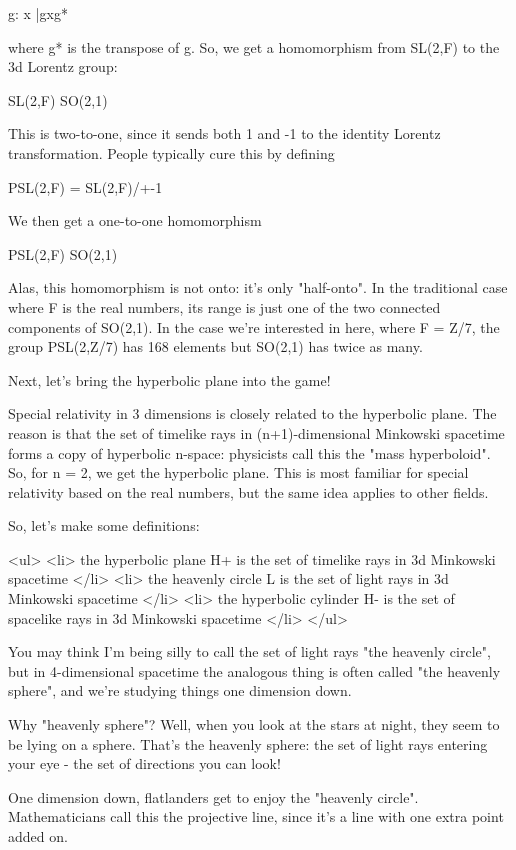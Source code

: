 g: x |\to  gxg*

where g* is the transpose of g.   So, we get a homomorphism from SL(2,F)
to the 3d Lorentz group:

SL(2,F) \to  SO(2,1)

This is two-to-one, since it sends both 1 and -1 to the identity Lorentz 
transformation.   People typically cure this by defining

PSL(2,F) = SL(2,F)/{+-1}

We then get a one-to-one homomorphism

PSL(2,F) \to  SO(2,1)

Alas, this homomorphism is not onto: it's only "half-onto".  
In the traditional
case where F is the real numbers, its range is just one of the two connected 
components of SO(2,1).  In the case we're interested in here, where F = Z/7, 
the group PSL(2,Z/7) has 168 elements but SO(2,1) has twice as many. 

Next, let's bring the hyperbolic plane into the game!

Special relativity in 3 dimensions is closely related to the hyperbolic
plane.  The reason is that the set of timelike rays in (n+1)-dimensional Minkowski
spacetime forms a copy of hyperbolic n-space: physicists call this the
"mass hyperboloid".   
So, for n = 2, we get the hyperbolic plane.  This is 
most familiar for special relativity based on the real numbers, but the same 
idea applies to other fields.

So, let's make some definitions:

<ul>
<li>
  the hyperbolic plane H+ is the set of timelike rays in 3d Minkowski spacetime
</li>
<li>
  the heavenly circle L is the set of light rays in 3d Minkowski spacetime
</li>
<li>
  the hyperbolic cylinder H- is the set of spacelike rays in 3d Minkowski spacetime
</li>
</ul>

You may think I'm being silly to call the set of light rays "the heavenly
circle", 
but in 4-dimensional spacetime the analogous thing is often called 
"the heavenly sphere", and we're studying things one dimension down.

Why "heavenly sphere"?  
Well, when you look at the stars at night, they seem to 
be lying on a sphere.  That's the heavenly sphere: the set of light rays 
entering 
your eye - the set of directions you can look!  

One dimension down, flatlanders get to enjoy the "heavenly circle".  Mathematicians 
call this the projective line, since it's a line with one extra point added on.

